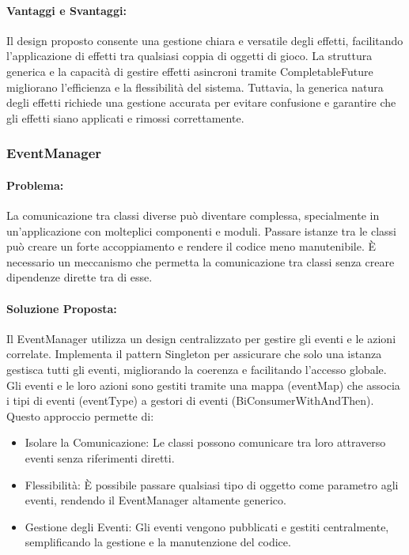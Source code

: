 \documentclass[a4paper,12pt]{report}
\begin{document}
\paragraph{Vantaggi e Svantaggi:}
Il design proposto consente una gestione chiara e versatile degli effetti, facilitando l’applicazione di effetti tra qualsiasi coppia di oggetti di gioco. La struttura generica e la capacità di gestire effetti asincroni tramite CompletableFuture migliorano l’efficienza e la flessibilità del sistema. Tuttavia, la generica natura degli effetti richiede una gestione accurata per evitare confusione e garantire che gli effetti siano applicati e rimossi correttamente.

\subsubsection{EventManager}

\paragraph{Problema:} La comunicazione tra classi diverse può diventare complessa, specialmente in un’applicazione con molteplici componenti e moduli. Passare istanze tra le classi può creare un forte accoppiamento e rendere il codice meno manutenibile. È necessario un meccanismo che permetta la comunicazione tra classi senza creare dipendenze dirette tra di esse.

\paragraph{Soluzione Proposta:} Il EventManager utilizza un design centralizzato per gestire gli eventi e le azioni correlate. Implementa il pattern Singleton per assicurare che solo una istanza gestisca tutti gli eventi, migliorando la coerenza e facilitando l’accesso globale. Gli eventi e le loro azioni sono gestiti tramite una mappa (eventMap) che associa i tipi di eventi (eventType) a gestori di eventi (BiConsumerWithAndThen). Questo approccio permette di:

\begin{itemize}
 \item Isolare la Comunicazione: Le classi possono comunicare tra loro attraverso eventi senza riferimenti diretti.
 \item Flessibilità: È possibile passare qualsiasi tipo di oggetto come parametro agli eventi, rendendo il EventManager altamente generico.
 \item Gestione degli Eventi: Gli eventi vengono pubblicati e gestiti centralmente, semplificando la gestione e la manutenzione del codice.
\end{itemize}
\end{document}

